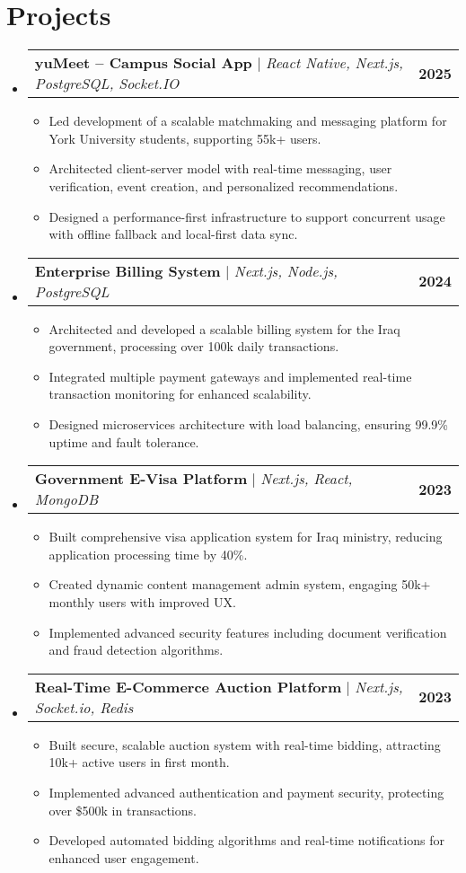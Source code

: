 \documentclass[letterpaper,11pt]{article}
\makeatletter
\newcommand{\resumeItem}[1]{
  \item\small{
    {#1 \vspace{-2pt}}
  }
}
\newcommand{\resumeProjectHeading}[2]{
    \item
    \begin{tabular*}{1.001\textwidth}{l@{\extracolsep{\fill}}r}
      \small#1 & \textbf{\small #2}\\
    \end{tabular*}\vspace{-7pt}
}
\newcommand{\resumeSubHeadingListStart}{\begin{itemize}[leftmargin=0.0in, label={}]}
\newcommand{\resumeSubHeadingListEnd}{\end{itemize}}
\newcommand{\resumeItemListStart}{\begin{itemize}}
\newcommand{\resumeItemListEnd}{\end{itemize}\vspace{-5pt}}
\makeatother
\begin{document}
\section{Projects}
    \vspace{-5pt}
    \resumeSubHeadingListStart
      \resumeProjectHeading
          {\textbf{yuMeet -- Campus Social App} $|$ \emph{React Native, Next.js, PostgreSQL, Socket.IO}}{2025}
          \resumeItemListStart
            \resumeItem{Led development of a scalable matchmaking and messaging platform for York University students, supporting 55k+ users.}
            \resumeItem{Architected client-server model with real-time messaging, user verification, event creation, and personalized recommendations.}
            \resumeItem{Designed a performance-first infrastructure to support concurrent usage with offline fallback and local-first data sync.}
          \resumeItemListEnd
          \vspace{-13pt}
      \resumeProjectHeading
          {\textbf{Enterprise Billing System} $|$ \emph{Next.js, Node.js, PostgreSQL}}{2024}
          \resumeItemListStart
            \resumeItem{Architected and developed a scalable billing system for the Iraq government, processing over 100k daily transactions.}
            \resumeItem{Integrated multiple payment gateways and implemented real-time transaction monitoring for enhanced scalability.}
            \resumeItem{Designed microservices architecture with load balancing, ensuring 99.9\% uptime and fault tolerance.}
          \resumeItemListEnd
          \vspace{-13pt}
      \resumeProjectHeading
          {\textbf{Government E-Visa Platform} $|$ \emph{Next.js, React, MongoDB}}{2023}
          \resumeItemListStart
            \resumeItem{Built comprehensive visa application system for Iraq ministry, reducing application processing time by 40\%.}
            \resumeItem{Created dynamic content management admin system, engaging 50k+ monthly users with improved UX.}
            \resumeItem{Implemented advanced security features including document verification and fraud detection algorithms.}
          \resumeItemListEnd
          \vspace{-13pt}
      \resumeProjectHeading
          {\textbf{Real-Time E-Commerce Auction Platform} $|$ \emph{Next.js, Socket.io, Redis}}{2023}
          \resumeItemListStart
            \resumeItem{Built secure, scalable auction system with real-time bidding, attracting 10k+ active users in first month.}
            \resumeItem{Implemented advanced authentication and payment security, protecting over \$500k in transactions.}
            \resumeItem{Developed automated bidding algorithms and real-time notifications for enhanced user engagement.}
          \resumeItemListEnd
    \resumeSubHeadingListEnd
\vspace{-15pt}
\end{document}
